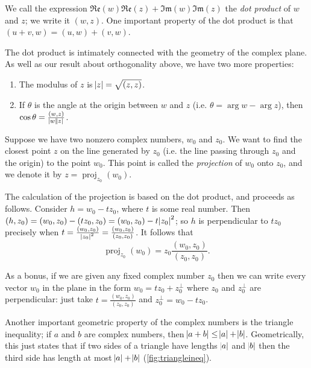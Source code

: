\documentclass[a4paper,10pt,titlepage]{article}
\theoremstyle{definition}
\DeclareMathOperator{\proj}{proj}
\newcommand*\realp[1]{ \mathfrak{Re} \left ( {#1} \right )  }
\newcommand*\imagp[1]{ \mathfrak{Im} \left ( {#1} \right )  }
\begin{document}
We call the expression $ \realp w \realp z + \imagp w \imagp z $ the \emph{dot product} of $ w $ and $ z $; we write it $ (w, z) $. One
important property of the dot product is that $ (u + v, w) = (u, w) + (v, w) $.

The dot product is intimately connected with the geometry of the complex plane. As well as our result about orthogonality above,
we have two more properties:
\begin{enumerate}
  \item The modulus of $ z $ is $ \abs{z} = \sqrt{(z, z)} $.
  \item If $ \theta $ is the angle at the origin between $ w $ and $ z $ (i.e. $ \theta = \arg w - \arg z $), then $ \cos \theta = \frac{(w,z)}{\abs{w}\abs{z}} $.
\end{enumerate}

Suppose we have two nonzero complex numbers, $ w_0 $ and $ z_0 $. We want to find the closest point $ z $ on the line generated by $ z_0 $
(i.e. the line passing through $ z_0 $ and the origin) to the point $ w_0 $. This point is called the \emph{projection} of $ w_0 $ onto $ z_0 $,
and we denote it by $ z = \proj_{z_0}(w_0) $.

The calculation of the projection is based on the dot product, and proceeds as follows. Consider $ h = w_0 - tz_0 $, where $ t $ is some
real number. Then $ (h, z_0) = (w_0, z_0) - (tz_0, z_0) = (w_0, z_0) - t\abs{z_0}^2 $; so $ h $ is perpendicular to $ tz_0 $ precisely
when $ t = \frac{(w_0, z_0)}{\abs{z_0}^2} = \frac{(w_0, z_0)}{(z_0, z_0)} $. It follows that
\begin{displaymath}
  \proj_{z_0}(w_0) = z_0 \frac{(w_0, z_0)}{(z_0, z_0)}.
\end{displaymath}

As a bonus, if we are given any fixed complex number $ z_0 $ then we can write every vector $ w_0 $ in the plane in the form $ w_0 = tz_0 + z_0^\perp $
where $ z_0 $ and $ z_0^\perp $ are perpendicular: just take $ t = \frac{(w_0, z_0)}{(z_0, z_0)} $ and $ z_0^\perp = w_0 - tz_0 $.

Another important geometric property of the complex numbers is the triangle inequality; if $ a $ and $ b $ are
complex numbers, then $ \abs{a + b} \leq \abs{a} + \abs{b} $. Geometrically, this just states that if two sides
of a triangle have lengths $ \abs{a} $ and $ \abs{b} $ then the third side has length at most $ \abs{a} + \abs{b} $ (\cref{fig:triangleineq}).
\end{document}
